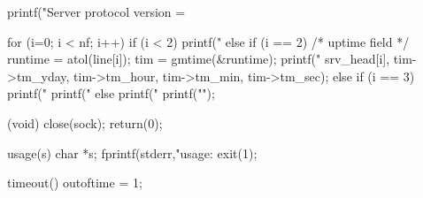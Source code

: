 \begin{code}
{        printf("Server protocol version = %
        
        for (i=0; i < nf; i++) {
                if (i < 2)
                        printf("%
                else if (i == 2) { /* uptime field */
                        runtime = atol(line[i]);
                        tim = gmtime(&runtime);
                        printf("%
                               srv_head[i],
                               tim->tm_yday,
                               tim->tm_hour,
                               tim->tm_min,
                               tim->tm_sec);
                } else if (i == 3) {
                        printf("%
                        printf("%
                } else printf("%
        }
        printf("\n");
        
        (void) close(sock);
        return(0);
}

usage(s)
        char *s;
{
        fprintf(stderr,"usage: %
        exit(1);
}

timeout()
{
        outoftime = 1;
}
\end{code}
